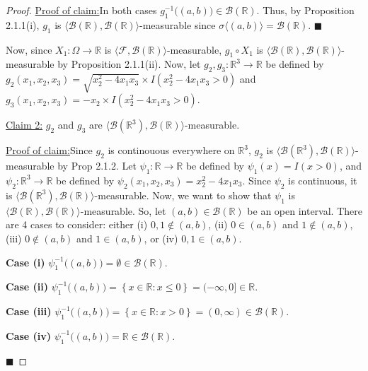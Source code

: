 \documentclass[12pt]{article}
\newenvironment{claimproof}[1]{\par\noindent\underline{Proof of claim:}\space#1}{\hfill $\blacksquare$}
\begin{document}
\begin{proof}
\begin{claimproof}
In both cases $g_{1}^{-1}\big( (a,b)\big) \in \mathcal{B}(\mathbb{R})$. Thus, by Proposition 2.1.1(i), $g_{1}$ is $\langle\mathcal{B}(\mathbb{R}),
\mathcal{B}(\mathbb{R})\rangle$-measurable since $\sigma\langle (a,b)\rangle = \mathcal{B}(\mathbb{R})$.
\end{claimproof}

Now, since $X_{1} : \Omega \rightarrow \mathbb{R}$ is $\langle\mathcal{F}, \mathcal{B}(\mathbb{R})\rangle$-measurable, $g_{1}\circ X_{1}$
is $\langle\mathcal{B}(\mathbb{R}), \mathcal{B}(\mathbb{R})\rangle$-measurable by Proposition 2.1.1(ii). Now, let 
$g_{2}, g_{3} : \mathbb{R}^{3} \rightarrow \mathbb{R}$ be defined by $g_{2}(x_{1}, x_{2}, x_3) = \sqrt{x_2^2 - 4x_1x_3}\times
I(x_2^2 - 4x_1x_3 > 0)$ and $g_3(x_1, x_2, x_3) = -x_2\times I(x_2^2 - 4x_1x_3 > 0)$. 

\underline{Claim 2:} $g_2$ and $g_3$ are 
$\langle\mathcal{B}(\mathbb{R}^3), \mathcal{B}(\mathbb{R})\rangle$-measurable.

\begin{claimproof}
Since $g_{2}$ is continouous everywhere on $\mathbb{R}^{3}$, $g_{2}$ is $\langle\mathcal{B}(\mathbb{R}^{3}),
\mathcal{B}(\mathbb{R})\rangle$-measurable by Prop 2.1.2. Let $\psi_{1} :
\mathbb{R} \rightarrow \mathbb{R}$ be defined by $\psi_{1}(x) = I(x > 0)$, and $\psi_{2} : \mathbb{R}^{3} \rightarrow \mathbb{R}$ be defined by
$\psi_{2}(x_{1}, x_{2}, x_{3}) = x_{2}^{2} - 4x_1x_3$.  Since $\psi_2$ is continuous, it is $\langle\mathcal{B}(\mathbb{R}^{3}),
\mathcal{B}(\mathbb{R})\rangle$-measurable. Now, we want to show that $\psi_1$ is $\langle\mathcal{B}(\mathbb{R}),
\mathcal{B}(\mathbb{R})\rangle$-measurable. So, let $(a,b) \in \mathcal{B}(\mathbb{R})$ be an open interval. There are 4 cases to consider: either (i)
$0,1 \notin (a,b)$, (ii) $0 \in (a,b)$ and $1 \notin (a,b)$, (iii) $0 \notin (a,b)$ and $1 \in (a,b)$, or (iv) $0,1 \in (a,b)$.

{\bf Case (i)} $\psi_{1}^{-1}\big( (a,b)\big) = \emptyset \in \mathcal{B}(\mathbb{R})$.

{\bf Case (ii)} $\psi_{1}^{-1}\big( (a,b) \big) = \left\{ x \in \mathbb{R} : x \leq 0 \right\} = (-\infty, 0] \in \mathbb{R}$.

{\bf Case (iii)} $\psi_{1}^{-1}\big( (a,b) \big) = \left\{ x \in \mathbb{R} : x > 0 \right\} = (0,\infty) \in \mathcal{B}(\mathbb{R})$.

{\bf Case (iv)} $\psi_{1}^{-1}\big( (a,b) \big) = \mathbb{R} \in \mathcal{B}(\mathbb{R})$.


\end{claimproof}
\end{proof}
\end{document}
